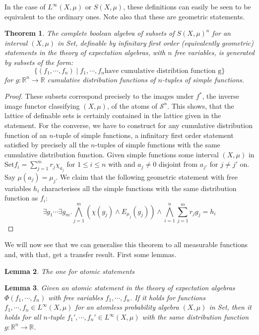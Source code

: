 \documentclass[a4paper]{amsproc}
\theoremstyle{plain}
\newtheorem{theorem}{Theorem}[section]
\newtheorem{lemma}[theorem]{Lemma}
\theoremstyle{definition}
\theoremstyle{remark}
\numberwithin{equation}{section}
\newcommand{\Set}{\textup{\textsf{Set}}}
\begin{document}
In the case of $L^\infty(X,\mu)$ or $S(X,\mu)$, these definitions can easily be seen to be equivalent to the ordinary ones. Note also that these are geometric statements.
\begin{theorem}
The complete boolean algebra of subsets of $S(X,\mu)^n$ for an interval $(X,\mu)$ in \Set, definable by infinitary first order (equivalently geometric) statements in the theory of expectation algebras, with $n$ free variables, is generated by subsets of the form:
\[\{(f_1,\cdots, f_n)\mid f_1,\cdots, f_n\text{have cumulative distribtion function g}\} \]
for $g:\mathbb{R}^n\rightarrow\mathbb{R}$ cumulative distribution functions of $n$-tuples of simple functions.
\end{theorem}
\begin{proof}
These subsets correspond precisely to the images under $f^*$, the inverse image functor classifying $(X,\mu)$, of the atoms of $\mathcal{S}^n$. This shows, that the lattice of definable sets is certainly contained in the lattice given in the statement.\newline
\indent For the converse, we have to construct for any cumulative distribution function of an $n$-tuple of simple functions, a infinitary first order statement satisfied by precisely all the $n$-tuples of simple functions with the same cumulative distribution function. Given simple functions some interval $(X,\mu)$ in \Set $f_i=\sum_{j=1}^{m} r_{j}\chi_{a_j}$ for $1\leq i\leq n$ with and $a_j\neq 0$ disjoint from $a_{j'}$ for  $j\neq j'$ on. Say $\mu(a_{j})=\mu_{j}$.  We claim that the following geometric statement with free variables $h_i$ characterises all the simple functions with the same distribution function as $f_i$:
\[\exists g_1\cdots \exists g_m. \bigwedge_{j=1}^m(\chi (g_j)\wedge E_{\mu_{j}}(g_j))\wedge \bigwedge_{i=1}^n\sum_{j=1}^m r_jg_j=h_i   \]  %
\end{proof}
We will now see that we can generalise this theorem to all measurable functions and, with that, get a transfer result. First some lemmas.
\begin{lemma} The one for atomic statements
\end{lemma}
\begin{lemma}\label{atomic_L_infty} Given an atomic statement in the theory of expectation algebras $\Phi(f_1,\cdots,f_n)$ with free variables $f_1,\cdots, f_n$. If it holds for functions $f_1,\cdots ,f_n\in L^\infty(X,\mu)$ for an atomless probability algebra $(X,\mu)$ in \Set, then it holds for all $n$-tuple $f_1',\cdots, f_n'\in L^\infty(X,\mu)$ with the same distribution function $g:\mathbb{R}^n\rightarrow \mathbb{R}$.
\end{lemma}
\end{document}
